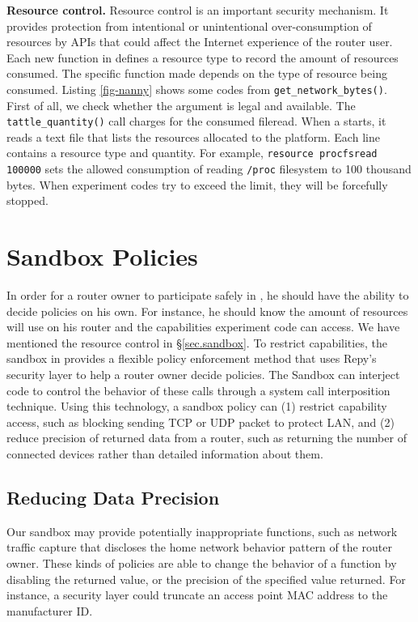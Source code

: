 

\textbf{Resource control.} Resource control is an important security mechanism. It provides protection from intentional or unintentional over-consumption of resources by APIs that could affect the Internet experience of the router user. Each new function in \sandboxname defines a resource type to record the amount of resources consumed. The specific function made depends on the type of resource being consumed. Listing \ref{fig-nanny} shows some codes from \texttt{get\_network\_bytes()}. First of all, we check whether the argument is legal and available. The \texttt{tattle\_quantity()} call charges for the consumed fileread. When a \sysname starts, it reads a text file that lists the resources allocated to the platform. Each line contains a resource type and quantity. For example, \texttt{resource procfsread 100000} sets the allowed consumption of reading \texttt{/proc} filesystem to 100 thousand bytes. When experiment codes try to exceed the limit, they will be forcefully stopped.

\section{Sandbox Policies}
\label{sec.policy}
In order for a router owner to participate safely in \sysname, he should have the ability to decide policies on his own. For instance, he should know the amount of resources \sysname will use on his router and the capabilities experiment code can access. We have mentioned the resource control in \S{\ref{sec.sandbox}}. To restrict capabilities, the sandbox in \sysname provides a flexible policy enforcement method that uses Repy's security layer to help a router owner decide policies. The Sandbox can interject code to control the behavior of these calls through a system call interposition technique. Using this technology, a sandbox policy can (1) restrict capability access, such as blocking sending TCP or UDP packet to protect LAN, and (2) reduce precision of returned data from a router, such as returning the number of connected devices rather than detailed information about them.

\subsection{Reducing Data Precision}
Our sandbox may provide potentially inappropriate functions, such as network traffic capture that discloses the home network behavior pattern of the router owner. These kinds of policies are able to change the behavior of a function by disabling the returned value, or the precision of the specified value returned. For instance, a security layer could truncate an access point MAC address to the manufacturer ID.

